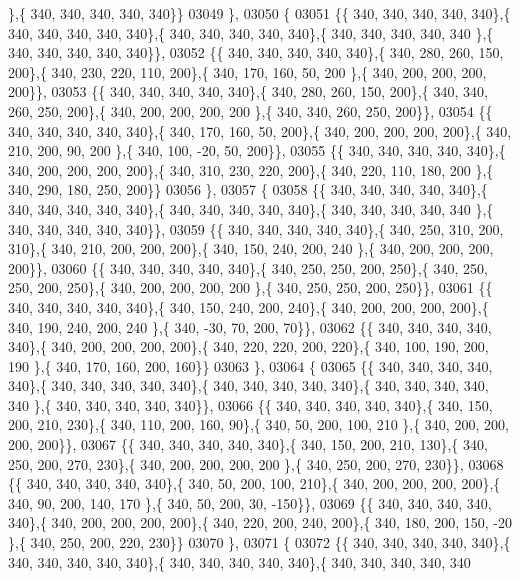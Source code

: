\begin{DoxyCode}
      \},\{ 340, 340, 340, 340, 340\}\}
03049 \},
03050 \{
03051 \{\{ 340, 340, 340, 340, 340\},\{ 340, 340, 340, 340, 340\},\{ 340, 340, 340, 340, 340\},\{ 340, 340, 340, 340, 340
      \},\{ 340, 340, 340, 340, 340\}\},
03052 \{\{ 340, 340, 340, 340, 340\},\{ 340, 280, 260, 150, 200\},\{ 340, 230, 220, 110, 200\},\{ 340, 170, 160,  50, 200
      \},\{ 340, 200, 200, 200, 200\}\},
03053 \{\{ 340, 340, 340, 340, 340\},\{ 340, 280, 260, 150, 200\},\{ 340, 340, 260, 250, 200\},\{ 340, 200, 200, 200, 200
      \},\{ 340, 340, 260, 250, 200\}\},
03054 \{\{ 340, 340, 340, 340, 340\},\{ 340, 170, 160,  50, 200\},\{ 340, 200, 200, 200, 200\},\{ 340, 210, 200,  90, 200
      \},\{ 340, 100, -20,  50, 200\}\},
03055 \{\{ 340, 340, 340, 340, 340\},\{ 340, 200, 200, 200, 200\},\{ 340, 310, 230, 220, 200\},\{ 340, 220, 110, 180, 200
      \},\{ 340, 290, 180, 250, 200\}\}
03056 \},
03057 \{
03058 \{\{ 340, 340, 340, 340, 340\},\{ 340, 340, 340, 340, 340\},\{ 340, 340, 340, 340, 340\},\{ 340, 340, 340, 340, 340
      \},\{ 340, 340, 340, 340, 340\}\},
03059 \{\{ 340, 340, 340, 340, 340\},\{ 340, 250, 310, 200, 310\},\{ 340, 210, 200, 200, 200\},\{ 340, 150, 240, 200, 240
      \},\{ 340, 200, 200, 200, 200\}\},
03060 \{\{ 340, 340, 340, 340, 340\},\{ 340, 250, 250, 200, 250\},\{ 340, 250, 250, 200, 250\},\{ 340, 200, 200, 200, 200
      \},\{ 340, 250, 250, 200, 250\}\},
03061 \{\{ 340, 340, 340, 340, 340\},\{ 340, 150, 240, 200, 240\},\{ 340, 200, 200, 200, 200\},\{ 340, 190, 240, 200, 240
      \},\{ 340, -30,  70, 200,  70\}\},
03062 \{\{ 340, 340, 340, 340, 340\},\{ 340, 200, 200, 200, 200\},\{ 340, 220, 220, 200, 220\},\{ 340, 100, 190, 200, 190
      \},\{ 340, 170, 160, 200, 160\}\}
03063 \},
03064 \{
03065 \{\{ 340, 340, 340, 340, 340\},\{ 340, 340, 340, 340, 340\},\{ 340, 340, 340, 340, 340\},\{ 340, 340, 340, 340, 340
      \},\{ 340, 340, 340, 340, 340\}\},
03066 \{\{ 340, 340, 340, 340, 340\},\{ 340, 150, 200, 210, 230\},\{ 340, 110, 200, 160,  90\},\{ 340,  50, 200, 100, 210
      \},\{ 340, 200, 200, 200, 200\}\},
03067 \{\{ 340, 340, 340, 340, 340\},\{ 340, 150, 200, 210, 130\},\{ 340, 250, 200, 270, 230\},\{ 340, 200, 200, 200, 200
      \},\{ 340, 250, 200, 270, 230\}\},
03068 \{\{ 340, 340, 340, 340, 340\},\{ 340,  50, 200, 100, 210\},\{ 340, 200, 200, 200, 200\},\{ 340,  90, 200, 140, 170
      \},\{ 340,  50, 200,  30, -150\}\},
03069 \{\{ 340, 340, 340, 340, 340\},\{ 340, 200, 200, 200, 200\},\{ 340, 220, 200, 240, 200\},\{ 340, 180, 200, 150, -20
      \},\{ 340, 250, 200, 220, 230\}\}
03070 \},
03071 \{
03072 \{\{ 340, 340, 340, 340, 340\},\{ 340, 340, 340, 340, 340\},\{ 340, 340, 340, 340, 340\},\{ 340, 340, 340, 340, 340

\end{DoxyCode}
